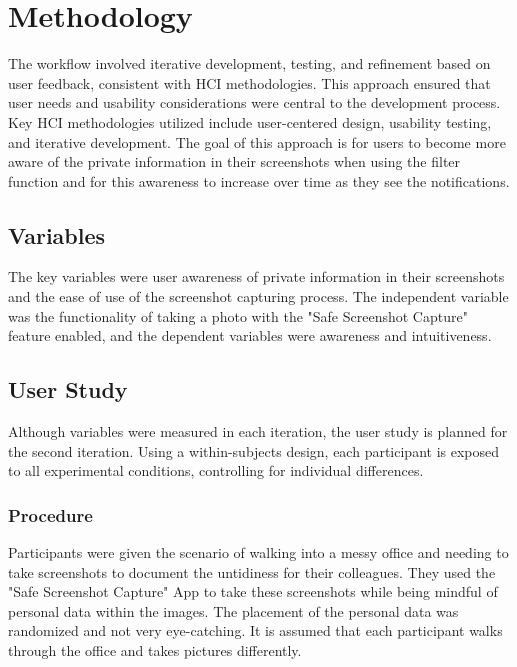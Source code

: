 \documentclass[sigconf,authordraft]{acmart}
\begin{document}
\section{Methodology}
The workflow involved iterative development, testing, and refinement based on user feedback, consistent with HCI methodologies. This approach ensured that user needs and usability considerations were central to the development process. Key HCI methodologies utilized include user-centered design, usability testing, and iterative development. The goal of this approach is for users to become more aware of the private information in their screenshots when using the filter function and for this awareness to increase over time as they see the notifications.

\subsection{Variables}
The key variables were user awareness of private information in their screenshots and the ease of use of the screenshot capturing process. The independent variable was the functionality of taking a photo with the "Safe Screenshot Capture" feature enabled, and the dependent variables were awareness and intuitiveness.

\subsection{User Study}
Although variables were measured in each iteration, the user study is planned for the second iteration. Using a within-subjects design, each participant is exposed to all experimental conditions, controlling for individual differences.

\subsubsection{Procedure}
Participants were given the scenario of walking into a messy office and needing to take screenshots to document the untidiness for their colleagues. They used the "Safe Screenshot Capture" App to take these screenshots while being mindful of personal data within the images. The placement of the personal data was randomized and not very eye-catching. It is assumed that each participant walks through the office and takes pictures differently.
\end{document}

